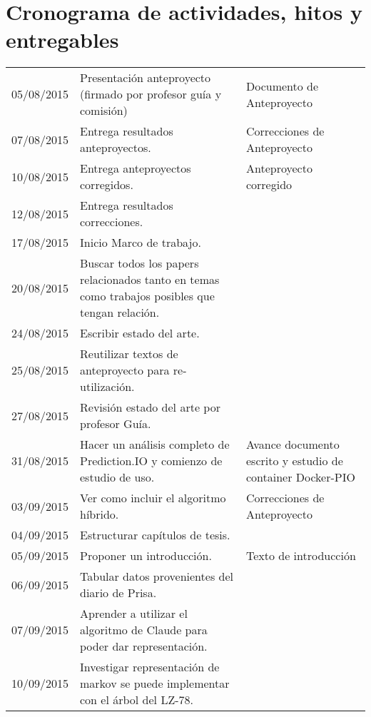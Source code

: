 \documentclass{udparticle}
\begin{document}
\section{Cronograma de actividades, hitos y entregables}
  \begin{center}
    \tabletail{\hline}
  	\begin{xtabular}{lp{7cm}p{6cm}}
  		
  		05/08/2015 & Presentación anteproyecto (firmado por profesor guía y comisión) &   Documento de Anteproyecto \\
  		07/08/2015 & Entrega resultados anteproyectos. & Correcciones de Anteproyecto \\
  		10/08/2015 & Entrega anteproyectos corregidos. & Anteproyecto corregido \\
  		12/08/2015 & Entrega resultados correcciones. & \\
  		17/08/2015 & Inicio Marco de trabajo. & \\
  		20/08/2015 & Buscar todos los papers relacionados tanto en temas como trabajos posibles que tengan relación.& \\
  		24/08/2015 & Escribir estado del arte. & \\
  		25/08/2015 & Reutilizar textos de anteproyecto para re-utilización.& \\
  		27/08/2015 & Revisión estado del arte por profesor Guía.& \\
  		31/08/2015 & Hacer un análisis completo de Prediction.IO y comienzo de estudio de uso.&  Avance documento escrito y estudio de container Docker-PIO \\
  		03/09/2015 & Ver como incluir el algoritmo híbrido.&  Correcciones de Anteproyecto \\
  		04/09/2015 & Estructurar capítulos de tesis.& \\
  		05/09/2015 & Proponer un introducción.& Texto de introducción  \\
  		06/09/2015 & Tabular datos provenientes del diario de Prisa.& \\
  		07/09/2015 & Aprender a utilizar el algoritmo de Claude para poder dar representación. & \\
  		10/09/2015 & Investigar representación de markov se puede implementar con el árbol del LZ-78.& \\

\end{xtabular}
\end{center}
\end{document}
